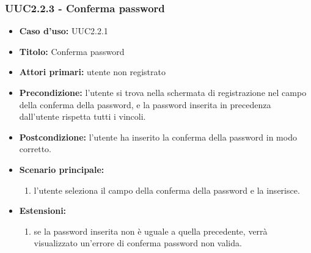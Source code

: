 \documentclass[casi-duso]{subfiles}
\begin{document}
\subsubsection{UUC2.2.3 - Conferma password}
\label{subsub:UUC2.2.3utente}
\begin{itemize}
  \item \textbf{Caso d’uso:} UUC2.2.1 
  \item \textbf{Titolo:} Conferma password
  \item \textbf{Attori primari:} utente non registrato
  \item \textbf{Precondizione:} l'utente si trova nella schermata di registrazione nel campo della conferma della password, 
  e la password inserita in precedenza dall'utente rispetta tutti i vincoli.
  \item \textbf{Postcondizione:} l'utente ha inserito la conferma della password in modo corretto. 
  \item \textbf{Scenario principale:} 
  \begin{enumerate}
    \item l'utente seleziona il campo della conferma della password e la inserisce.
  \end{enumerate}
  \item \textbf{Estensioni:} 
  \begin{enumerate}
    \item se la password inserita non è uguale a quella precedente, verrà visualizzato un'errore di conferma password non valida.
  \end{enumerate}     
\end{itemize}

\end{document}
